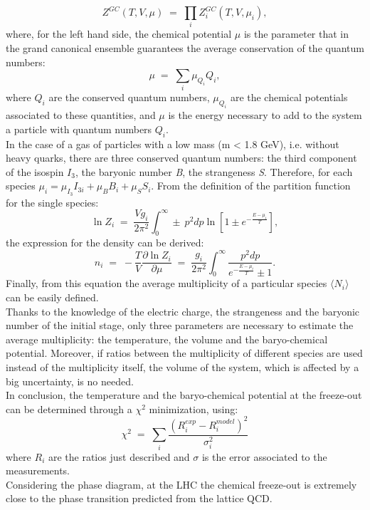 \begin{equation}
 Z^{GC}(T,V,\mu)\; = \;\prod_{i}Z^{GC}_{i}(T,V,\mu_{i}),
\end{equation}
where, for the left hand side, the chemical potential $\mu$ is the parameter that in the grand canonical ensemble guarantees the average conservation of the quantum numbers:
\begin{equation}
\mu \; = \;\sum_{i} \mu_{Q_{i}}Q_{i},
\end{equation}
where $Q_{i}$ are the conserved quantum numbers, $\mu_{Q_{i}}$ are the chemical potentials associated to these quantities, and $\mu$ is the energy necessary to add to the system a particle with quantum numbers $Q_{i}$.\\
In the case of a gas of particles with a low mass (m < 1.8 GeV), i.e. without heavy quarks, there are three conserved quantum numbers: the third component of the isospin $I_{3}$, the baryonic number \textit{B}, the strangeness \textit{S}. Therefore, for each species $\mu_{i} = \mu_{I_{3}}I_{3i} + \mu_{B}B_{i} + \mu_{S}S_{i}$.
From the definition of the partition function for the single species:
\begin{equation}
 \ln Z_{i}\; = \; \frac{Vg_{i}}{2\pi^{2}}\int_{0}^{\infty}\pm\:p^{2}dp\ln[1\pm e^{-\frac{E-\mu_{i}}{T}}],
\end{equation}
the expression for the density can be derived:
\begin{equation}
n_{i}\; = \; -\frac{T}{V} \frac{\partial \ln Z_{i}}{\partial \mu} \;=\; \frac{g_{i}}{2\pi^{2}} \int_{0}^{\infty}\frac{p^{2}dp}{e^{-\frac{E-\mu_{i}}{T}}\pm1}.
\end{equation}
Finally, from this equation the average multiplicity of a particular species $\langle N_{i} \rangle$ can be easily defined.\\
Thanks to the knowledge of the electric charge, the strangeness and the baryonic number of the initial stage, only three parameters are necessary to estimate the average multiplicity: the temperature, the volume and the baryo-chemical potential. Moreover, if ratios between the multiplicity of different species are used instead of the multiplicity itself, the volume of the system, which is affected by a big uncertainty, is no needed.\\
In conclusion, the temperature and the baryo-chemical potential at the freeze-out can be determined through a $\chi^{2}$ minimization, using:
\begin{equation}
 \chi^{2}\;=\;\sum_{i}\frac{(R_{i}^{exp}-R_{i}^{model})^{2}}{\sigma_{i}^{2}}
\end{equation}
where $R_{i}$ are the ratios just described and $\sigma$ is the error associated to the measurements.\\
Considering the phase diagram, at the LHC the chemical freeze-out is extremely close to the phase transition predicted from the lattice QCD.\\
%
